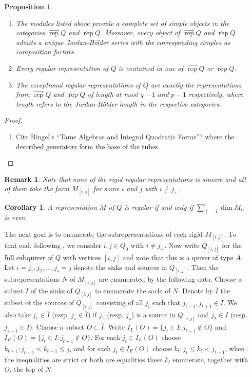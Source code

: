 \documentclass[11pt]{amsart}
\newcommand{\rep}{\operatorname{rep}}
\newtheorem{corollary}[theorem]{Corollary}
\newtheorem{proposition}[theorem]{Proposition}
\newtheorem{remark}[theorem]{Remark}
\numberwithin{equation}{section}
\begin{document}
  \begin{proposition}\mbox{}
    \begin{enumerate}
      \item The modules listed above provide a complete set of simple objects in the categories $\overrightarrow{\rep}Q$ and $\overleftarrow{\rep}Q$.  Moreover, every object of $\overrightarrow{\rep}Q$ and $\overleftarrow{\rep}Q$ admits a unique Jordan-H\"older series with the corresponding simples as composition factors.
      \item Every regular representation of $Q$ is contained in one of $\overrightarrow{\rep}Q$ or $\overleftarrow{\rep}Q$.
      \item The exceptional regular representations of $Q$ are exactly the representations from $\overrightarrow{\rep}Q$ and $\overleftarrow{\rep}Q$ of length at most $q-1$ and $p-1$ respectively, where length refers to the Jordan-H\"older length in the respective categories.  
    \end{enumerate}
  \end{proposition}
  \begin{proof}
    \begin{enumerate}
      \item Cite Ringel's ``Tame Algebras and Integral Quadratic Forms''?  \cite[Theorem 3.6.5]{Rin84} where the described generators form the base of the tubes.
    \end{enumerate}
  \end{proof}
  \begin{remark}\label{rem:rigid regulars}
    Note that none of the rigid regular representations is sincere and all of them take the form $M_{[i,j]}$ for some $i$ and $j$ with $i\ne j_+$.
  \end{remark}

  \begin{corollary}
    A representation $M$ of $Q$ is regular if and only if $\sum\limits_{\ell=1}^r\dim M_{i_\ell}$ is even.
  \end{corollary}

  The next goal is to enumerate the subrepresentations of each rigid $M_{[i,j]}$.  To that end, following , we consider $i,j\in Q_0$ with $i\ne j_+$.  Now write $Q_{[i,j]}$ for the full subquiver of $Q$ with vertices $[i,j]$ and note that this is a quiver of type $A$.  Let $i=j_1,j_2,\ldots,j_s=j$ denote the sinks and sources in $Q_{[i,j]}$.  Then the subrepresentations $N$ of $M_{[i,j]}$ are enumerated by the following data.  Choose a subset $I$ of the sinks of $Q_{[i,j]}$ to enumerate the socle of $N$.  Denote by $\bar{I}$ the subset of the sources of $Q_{[i,j]}$ consisting of all $j_t$ such that $j_{t-1},j_{t+1}\in I$.  We also take $j_1\in\bar{I}$ (resp. $j_s\in\bar{I}$) if $j_1$ (resp. $j_s$) is a source in $Q_{[i,j]}$ and $j_2\in I$ (resp. $j_{s-1}\in I$).  Choose a subset $O\subset\bar{I}$.  Write $I_L(O)=\{j_t\in I:j_{t-1}\notin O\}$ and $I_R(O)=\{j_t\in I:j_{t+1}\notin O\}$.  For each $j_t\in I_L(O)$ choose $k_{t-1}:j_{t-1}<k_{t-1}\le j_t$ and for each $j_t\in I_R(O)$ choose $k_t:j_t\le k_t<j_{t+1}$, when the inequalities are strict or both are equalities these $k_t$ enumerate, together with $O$, the top of $N$.
\end{document}
